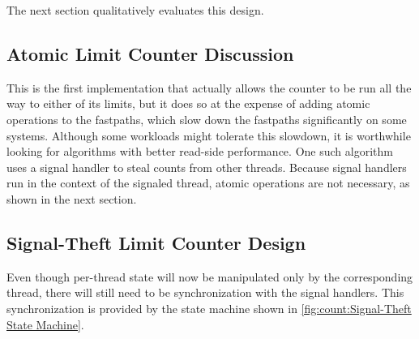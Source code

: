 \QuickQuizEnd

The next section qualitatively evaluates this design.
\ebFloatBarrier

\subsection{Atomic Limit Counter Discussion}

This is the first implementation that actually allows the counter to
be run all the way to either of its limits, but it does so at the
expense of adding atomic operations to the fastpaths, which slow down
the fastpaths significantly on some systems.
Although some workloads might tolerate this slowdown, it is worthwhile
looking for algorithms with better read-side performance.
One such algorithm uses a signal handler to steal counts from other
threads.
Because signal handlers run in the context of the signaled thread,
atomic operations are not necessary, as shown in the next section.

\QuickQuizEnd

\subsection{Signal-Theft Limit Counter Design}
\label{sec:count:Signal-Theft Limit Counter Design}

Even though per-thread state will now be manipulated only by the
corresponding thread, there will still need to be synchronization
with the signal handlers.
This synchronization is provided by the state machine shown in
\cref{fig:count:Signal-Theft State Machine}.

